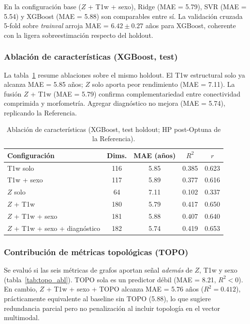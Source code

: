 \documentclass[12pt,a4paper]{article}
\begin{document}
En la configuración base ($Z$ + T1w + sexo), Ridge (MAE = 5.79), SVR (MAE = 5.54) y XGBoost
(MAE = 5.88) son comparables entre sí. La validación cruzada 5-fold sobre \emph{trainval}
arroja MAE = $6.42 \pm 0.27$ años para XGBoost, coherente con la ligera sobreestimación
respecto del holdout.

\subsubsection{Ablación de características (XGBoost, test)}

La tabla~\ref{tab:ablacion} resume ablaciones sobre el mismo holdout. El T1w estructural solo
ya alcanza MAE = 5.85 años; $Z$ solo aporta peor rendimiento (MAE = 7.11). La fusión $Z$ + T1w
(MAE = 5.79) confirma complementariedad entre conectividad comprimida y morfometría. Agregar
diagnóstico no mejora (MAE = 5.74), replicando la Referencia.

\begin{table}[H]
  \centering
  \caption{Ablación de características (XGBoost, test holdout; HP post-Optuna de la Referencia).}
  \label{tab:ablacion}
  \begin{tabular}{lcccc}
    \toprule
    Configuración & Dims. & MAE (años) & $R^2$ & $r$ \\
    \midrule
    T1w solo & 116 & 5.85 & 0.385 & 0.623 \\
    T1w + sexo & 117 & 5.89 & 0.377 & 0.616 \\
    $Z$ solo & 64 & 7.11 & 0.102 & 0.337 \\
    $Z$ + T1w & 180 & 5.79 & 0.417 & 0.650 \\
    $Z$ + T1w + sexo & 181 & 5.88 & 0.407 & 0.640 \\
    $Z$ + T1w + sexo + diagnóstico & 182 & 5.74 & 0.419 & 0.653 \\
    \bottomrule
  \end{tabular}
\end{table}

\subsubsection{Contribución de métricas topológicas (TOPO)}

Se evaluó si las seis métricas de grafos aportan señal \emph{además} de $Z$, T1w y sexo
(tabla~\ref{tab:topo_abl}). TOPO sola es un predictor débil (MAE = 8.21, $R^2 < 0$). En cambio,
$Z$ + T1w + sexo + TOPO alcanza MAE = 5.76 años ($R^2 = 0.412$), prácticamente equivalente al
baseline sin TOPO (5.88), lo que sugiere redundancia parcial pero no penalización al incluir
topología en el vector multimodal.
\end{document}
